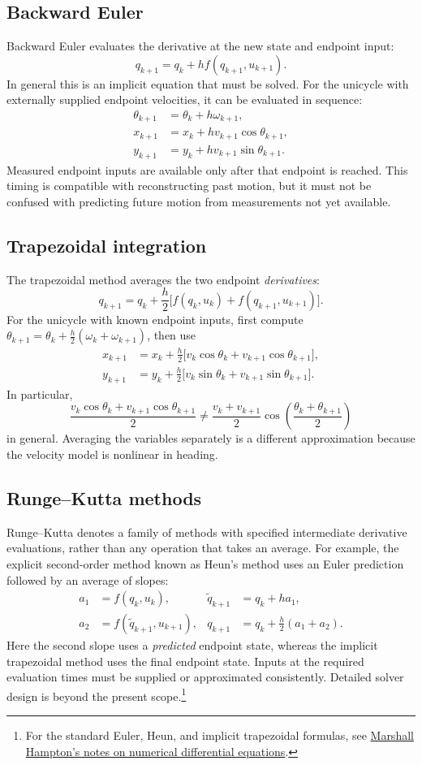 \subsection{Backward Euler}
Backward Euler evaluates the derivative at the new state and endpoint input:
\[
 q_{k+1}=q_k+h f(q_{k+1},u_{k+1}).
\]
In general this is an implicit equation that must be solved. For the
unicycle with externally supplied endpoint velocities, it can be evaluated
in sequence:
\begin{align*}
 \theta_{k+1}&=\theta_k+h\omega_{k+1},\\
 x_{k+1}&=x_k+h v_{k+1}\cos\theta_{k+1},\\
 y_{k+1}&=y_k+h v_{k+1}\sin\theta_{k+1}.
\end{align*}
Measured endpoint inputs are available only after that endpoint is reached.
This timing is compatible with reconstructing past motion, but it must not
be confused with predicting future motion from measurements not yet available.

\subsection{Trapezoidal integration}
The trapezoidal method averages the two endpoint \emph{derivatives}:
\[
 q_{k+1}=q_k+\frac h2
 \bigl[f(q_k,u_k)+f(q_{k+1},u_{k+1})\bigr].
\]
For the unicycle with known endpoint inputs, first compute
$\theta_{k+1}=\theta_k+\tfrac h2(\omega_k+\omega_{k+1})$, then use
\begin{align*}
 x_{k+1}&=x_k+\frac h2
  \bigl[v_k\cos\theta_k+v_{k+1}\cos\theta_{k+1}\bigr],\\
 y_{k+1}&=y_k+\frac h2
  \bigl[v_k\sin\theta_k+v_{k+1}\sin\theta_{k+1}\bigr].
\end{align*}
In particular,
\[
 \frac{v_k\cos\theta_k+v_{k+1}\cos\theta_{k+1}}2
 \ne
 \frac{v_k+v_{k+1}}2\cos\!\left(\frac{\theta_k+\theta_{k+1}}2\right)
\]
in general. Averaging the variables separately is a different approximation
because the velocity model is nonlinear in heading.

\subsection{Runge--Kutta methods}
Runge--Kutta denotes a family of methods with specified intermediate
derivative evaluations, rather than any operation that takes an average.
For example, the explicit second-order method known as Heun's method uses
an Euler prediction followed by an average of slopes:
\begin{align*}
 a_1&=f(q_k,u_k),&\widetilde q_{k+1}&=q_k+h a_1,\\
 a_2&=f(\widetilde q_{k+1},u_{k+1}),&
 q_{k+1}&=q_k+\frac h2(a_1+a_2).
\end{align*}
Here the second slope uses a \emph{predicted} endpoint state, whereas the
implicit trapezoidal method uses the final endpoint state. Inputs at the
required evaluation times must be supplied or approximated consistently.
Detailed solver design is beyond the present scope.\footnote{For the
standard Euler, Heun, and implicit trapezoidal formulas, see
\href{https://www.d.umn.edu/~mhampton/NA/ODEInt/}{Marshall Hampton's notes on numerical differential equations}.}

